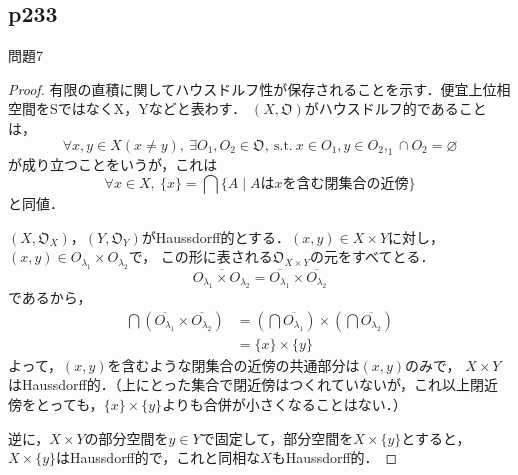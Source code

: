 \documentclass[dvipdfmx,uplatex,11pt]{jsarticle}
\begin{document}
    \subsection{p233}
問題7
\begin{leftbar}
    \begin{proof}
有限の直積に関してハウスドルフ性が保存されることを示す．便宜上位相空間をSではなくX，Yなどと表わす．
    $(X,\mathfrak{O})$がハウスドルフ的であることは，
    \begin{equation}
        \forall x, y \in X (x\neq y), ~ \exists O_1 , O_2 \in \mathfrak{O},~\mathrm{s.t.} ~ x\in O_1 , y \in O_2 , _1 \cap O_2 = \varnothing
    \end{equation}
    が成り立つことをいうが，これは
    \begin{equation}
        \forall x \in X , ~ \{ x\} = \bigcap \{ A \mid \text{$A$は$x$を含む閉集合の近傍}\}
    \end{equation}
    と同値．

    $(X, \mathfrak{O}_X )$，$(Y,\mathfrak{O}_Y)$がHaussdorff的とする．$(x,y) \in X \times Y$に対し，$(x,y) \in O_{\lambda_1} \times O_{\lambda_2}$で，
    この形に表される$\mathfrak{O}_{X \times Y}$の元をすべてとる．
    \[
        \overline{O_{\lambda_1} \times O_{\lambda_2}} = \overline{O_{\lambda_1}} \times \overline{O_{\lambda_2}}
    \]
    であるから，
    \begin{align*}
        \bigcap (\overline{O_{\lambda_1}} \times \overline{O_{\lambda_2}}) & = (\bigcap \overline{O_{\lambda_1}}) \times (\bigcap \overline{O_{\lambda_2}}) \\
        & = \{ x\} \times \{y\}
    \end{align*}
    よって，$(x,y)$を含むような閉集合の近傍の共通部分は$(x,y)$のみで，
    $X \times Y$はHaussdorff的．（上にとった集合で閉近傍はつくれていないが，これ以上閉近傍をとっても，$\{x\} \times \{y\}$よりも合併が小さくなることはない．）

    逆に，$X \times Y$の部分空間を$y \in Y$で固定して，部分空間を$X \times \{y\}$とすると，$X \times \{y\}$はHaussdorff的で，これと同相な$X$もHaussdorff的．
\end{proof}
\end{leftbar}
\end{document}
